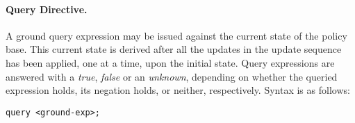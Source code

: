 \documentclass[10pt, twocolumn]{article}
\begin{document}
        \paragraph{Query Directive.}

          A ground query expression may be issued against the current state of
          the policy base. This current state is derived after all the updates
          in the update sequence has been applied, one at a time, upon the
          initial state. Query expressions are answered with a \emph{true},
          \emph{false} or an \emph{unknown}, depending on whether the queried
          expression holds, its negation holds, or neither, respectively.
          Syntax is as follows:

          \begin{verbatim}query <ground-exp>;\end{verbatim} 
\end{document}
